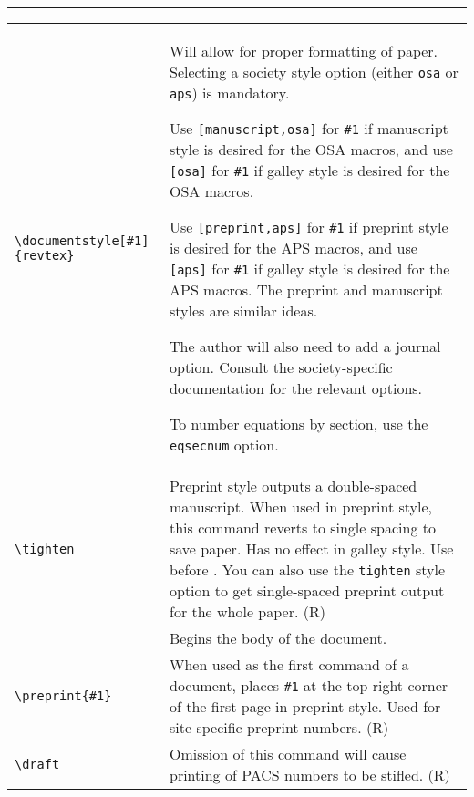 \bigskip\hrule\bigskip
\begin{quasitable}
\begin{tabular}{lp{4.5in}}
\verb+\documentstyle[#1]{revtex}+ &
              Will allow for proper formatting of paper. Selecting
              a society style option (either \verb+osa+ or \verb+aps+)
              is mandatory.

              Use \verb+[manuscript,osa]+ for \verb+#1+ if
              manuscript style is desired for the OSA macros,
              and use \verb+[osa]+ for
              \verb+#1+ if galley style is desired for the OSA macros.

              Use \verb+[preprint,aps]+ for \verb+#1+ if
              preprint style is desired for the APS macros,
              and use \verb+[aps]+ for
              \verb+#1+ if galley style is desired for the APS macros.
              The preprint and manuscript styles are similar ideas.

              The author will also need to add a journal option.
              Consult the society-specific documentation for the
              relevant options.

              To number
              equations by section, use the \verb+eqsecnum+
               option.\\[4pt]


\verb+\tighten+  &
           Preprint style outputs a double-spaced manuscript.
           When used in preprint style, this command reverts to
           single spacing to save paper. Has no effect in galley
           style.  Use before \verb++. You can
           also use the \verb+tighten+ style option to get
           single-spaced preprint output for the whole paper. (R)
             \\[4pt]

\verb++  &
        Begins the body of the \REVTeX{} document.
                          \\[4pt]

\verb+\preprint{#1}+  &
           When used as the first command of a document, places
           \verb+#1+ at the top right corner of the first page in
           preprint style. Used for site-specific preprint
           numbers. (R)
             \\[4pt]

\verb+\draft+  &
                  Omission of this command will cause printing of PACS
                        numbers to be stifled. (R)
                          \\[4pt]


\end{tabular}
\end{quasitable}
